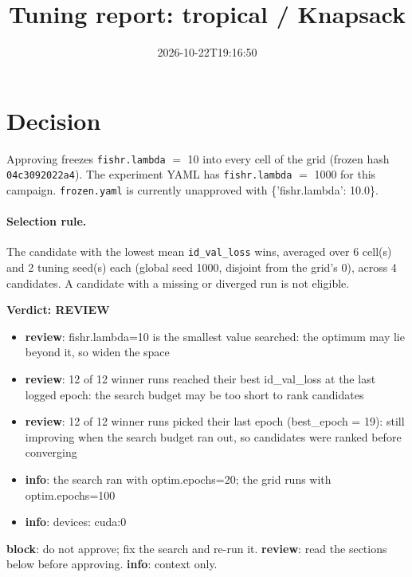 \documentclass[10pt]{article}
\title{Tuning report: tropical / Knapsack}
\date{2026-10-22T19:16:50}
\begin{document}
\maketitle

\section{Decision}
Approving freezes
\texttt{fishr.lambda} $=$ 10 into every cell of the grid (frozen hash \texttt{04c3092022a4}).
The experiment YAML has
\texttt{fishr.lambda} $=$ 1000 for this campaign.
\texttt{frozen.yaml} is currently unapproved with \{'fishr.lambda': 10.0\}.

\paragraph{Selection rule.} The candidate with the lowest mean \texttt{id\_val\_loss} wins, averaged over 6 cell(s) and 2 tuning seed(s) each (global seed 1000, disjoint from the grid's 0), across 4 candidates. A candidate with a missing or diverged run is not eligible.

\begin{framed}
\noindent\textbf{Verdict: \textcolor{orange!85!black}{REVIEW}}
\begin{itemize}\setlength\itemsep{0pt}
\item \textbf{review}: fishr.lambda=10 is the smallest value searched: the optimum may lie beyond it, so widen the space
\item \textbf{review}: 12 of 12 winner runs reached their best id\_val\_loss at the last logged epoch: the search budget may be too short to rank candidates
\item \textbf{review}: 12 of 12 winner runs picked their last epoch (best\_epoch = 19): still improving when the search budget ran out, so candidates were ranked before converging
\item \textbf{info}: the search ran with optim.epochs=20; the grid runs with optim.epochs=100
\item \textbf{info}: devices: cuda:0
\end{itemize}
\end{framed}
\noindent\textbf{block}: do not approve; fix the search and re-run it. \textbf{review}: read the sections below before approving. \textbf{info}: context only.
\end{document}
